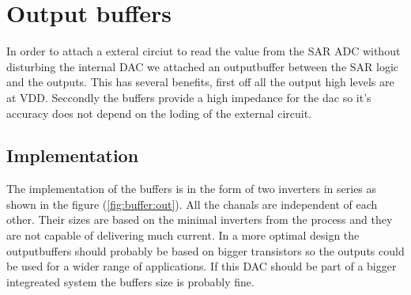 \documentclass[english, 12pt, a4paper]{ifimaster}
\begin{document}



\section{Output buffers}
In order to attach a exteral circiut to read the value from the SAR ADC without disturbing the internal DAC we attached an outputbuffer between the SAR logic and the outputs.
This has several benefits, first off all the output high levels are at VDD. Seccondly the buffers provide a high impedance for the dac so it's accuracy does not depend on the loding of the external circuit.

\subsection{Implementation}
The implementation of the buffers is in the form of two inverters in series as shown in the figure (\ref{fig:buffer:out}). All the chanals are independent of each other. 
Their sizes are based on the minimal inverters from the process and they are not capable of delivering much current. 
In a more optimal design the outputbuffers should probably be based on bigger transistors so the outputs could be used for a wider range of applications. If this DAC should be part of a bigger integreated system
the buffers size is probably fine.
\end{document}

